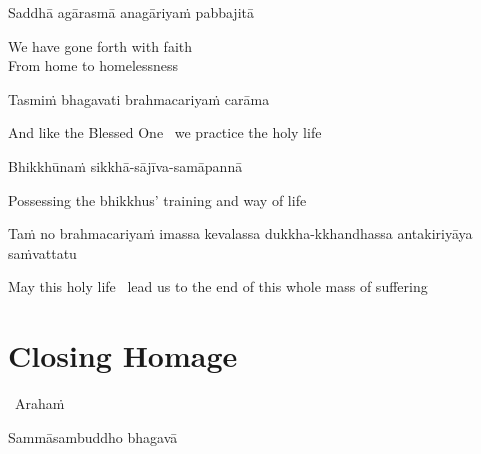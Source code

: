 Saddhā agārasmā anagāriyaṁ pabbajitā

\begin{english}
  We have gone forth with faith\\
  From home to homelessness
\end{english}

Tasmiṁ bhagavati brahmacariyaṁ carāma

\begin{english}
  And like the Blessed One \breathmark\ we practice the holy life
\end{english}

Bhikkhūnaṁ sikkhā-sājīva-samāpannā

\begin{english}
  Possessing the bhikkhus' training and way of life\makeatletter\hyperlink{endnote28-appendix}\makeatother
\end{english}

\begin{pali-hang}
  Taṁ no brahmacariyaṁ imassa kevalassa dukkha-kkhandhassa antakiriyāya saṁvattatu
\end{pali-hang}

\begin{english}
  May this holy life \breathmark\ lead us to the end of this whole mass of suffering
\end{english}

\suttaRef{[Thai]}




\section{Closing Homage}
\label{closing-homage}

\vspace{5pt}

\begin{leader}
  \anglebracketleft\ \hspace{-0.5mm}Arahaṁ \hspace{-0.5mm}\anglebracketright\
\end{leader}

\vspace{-0.5cm}

Sammāsambuddho bhagavā

